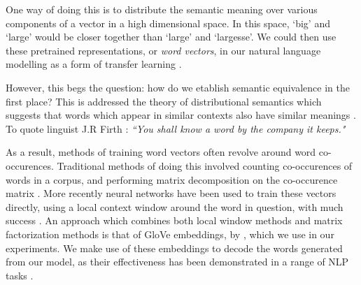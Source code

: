 One way of doing this is to distribute the semantic meaning over various components of a vector in a high dimensional space. In this space, `big' and `large' would be closer together than `large' and `largesse'. We could then use these pretrained representations, or \textit{word vectors}, in our natural language modelling as a form of transfer learning \citep{hinton_parallel_1986}.

However, this begs the question: how do we etablish semantic equivalence in the first place? This is addressed the theory of distributional semantics which suggests that words which appear in similar contexts also have similar meanings \citep{harris_distributional_1954}.
To quote linguist J.R Firth : \textit{``You shall know a word by the company it keeps."} \citep{firth_synopsis_1957}

As a result, methods of training word vectors often revolve around word co-occurences.  Traditional methods of doing this involved counting co-occurences of words in a corpus, and performing matrix decomposition on the co-occurence matrix \citep{deerwester_indexing_1990}. More recently neural networks have been used to train these vectors directly, using a local context window around the word in question, with much success \citep{mikolov_efficient_2013,mikolov_distributed_2013}. An approach which combines both local window methods and matrix factorization methods is that of GloVe embeddings, by \citet{pennington_glove_2014}, which we use in our experiments. 
We make use of these embeddings to decode the words generated from our model, as their effectiveness has been demonstrated in a range of NLP tasks \citep{young_recent_2017}.






